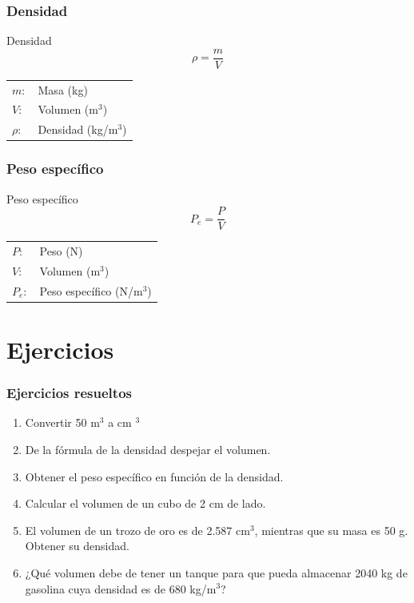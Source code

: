 \documentclass[handout]{beamer}
\begin{document}
\begin{frame}
  \frametitle{Densidad}

  \begin{block}{Densidad}
    {\huge
      \[\rho = \frac{m}{V}\]}
  \end{block}
  \begin{tabular}{ll}
    $m:$ & Masa (kg)  \\ 
    $V:$ & Volumen (m$^3$) \\ 
    $\rho:$ & Densidad (kg/m$^3$) \\
  \end{tabular}

\end{frame}


\begin{frame}
  \frametitle{Peso específico}

  \begin{block}{Peso específico}
      {\huge
      \[P_{e} = \frac{P}{V}\]}
  \end{block}
  \begin{tabular}{ll}
    $P:$ & Peso (N) \\
    $V:$ & Volumen (m$^3$) \\
    $P_{e}:$ & Peso específico (N/m$^3$) \\
  \end{tabular}    

\end{frame}


\section{Ejercicios}
\begin{frame}
\frametitle{Ejercicios resueltos}
\begin{enumerate}
\item Convertir 50 m$^3$ a cm $^3$
\item De la fórmula de la densidad despejar el volumen.
\item Obtener el peso específico en función de la densidad.
\item Calcular el volumen de un cubo de 2 cm de lado.
\item El volumen de un trozo de oro es de 2.587 cm$^3$, mientras que su masa es 50
  g. Obtener su densidad.
\item ¿Qué volumen debe de tener un tanque para que pueda almacenar 2040 kg de gasolina
  cuya densidad es de 680 kg/m$^3$?
\end{enumerate}
\end{frame}
\end{document}
